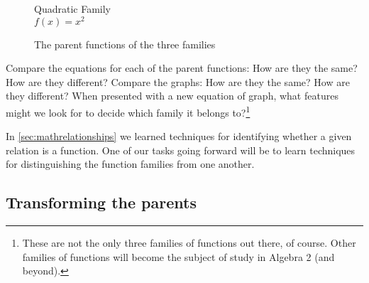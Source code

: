 \begin{figure}
\begin{minipage}{0.32\linewidth}
\end{minipage}
\begin{minipage}{0.32\linewidth}
\centering
Quadratic Family
\\ $f(x)=x^2$\par\medskip
{}
\end{minipage}
\caption{The parent functions of the three families}
\label{fig:parents}
\end{figure}

Compare the equations for each of the parent functions: How are they the same? How are they different? Compare the graphs: How are they the same? How are they different? When presented with a new equation of graph, what features might we look for to decide which family it belongs to?\footnote{These are not the only three families of functions out there, of course. Other families of functions will become the subject of study in Algebra 2 (and beyond).}

In \cref{sec:mathrelationships} we learned techniques for identifying whether a given relation is a function. One of our tasks going forward will be to learn techniques for distinguishing the function families from one another.


\subsection{Transforming the parents}

